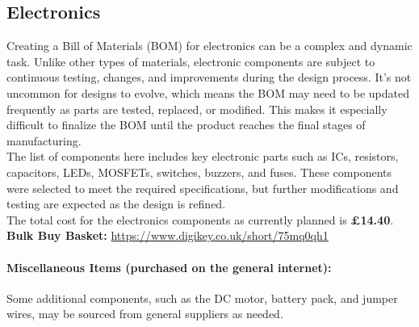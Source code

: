 \documentclass{article}
\begin{document}
\begin{adjustbox}{valign=t,minipage={0.22\textwidth}}
\subsection{Electronics}
Creating a Bill of Materials (BOM) for electronics can be a complex and dynamic task. Unlike other types of materials, electronic components are subject to continuous testing, changes, and improvements during the design process. It's not uncommon for designs to evolve, which means the BOM may need to be updated frequently as parts are tested, replaced, or modified. This makes it especially difficult to finalize the BOM until the product reaches the final stages of manufacturing.\\[8pt]
The list of components here includes key electronic parts such as ICs, resistors, capacitors, LEDs, MOSFETs, switches, buzzers, and fuses. These components were selected to meet the required specifications, but further modifications and testing are expected as the design is refined.\\[8pt]
The total cost for the electronics components as currently planned is \textbf{\pounds14.40}.\\[8pt]
\textbf{Bulk Buy Basket:} \url{https://www.digikey.co.uk/short/75mq0qh1}\\[8pt]
\paragraph{Miscellaneous Items (purchased on the general internet):}\mbox{}
Some additional components, such as the DC motor, battery pack, and jumper wires, may be sourced from general suppliers as needed.
\end{adjustbox}

\vspace*{\fill}

	
	
\end{document}
